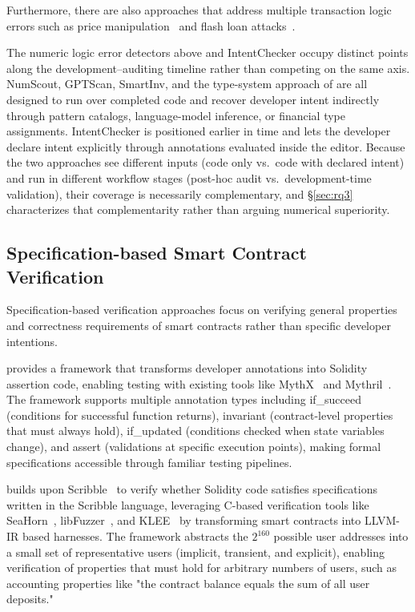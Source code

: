 \documentclass[pdflatex,sn-basic]{sn-jnl}%
\theoremstyle{thmstyleone}%
\theoremstyle{thmstyletwo}%
\theoremstyle{thmstylethree}%
\begin{document}
Furthermore, there are also approaches that address multiple transaction logic errors such as price manipulation~\citep{defiranger,defiguard,pomabuster,secplf,defitainter}
and flash loan attacks~\citep{defitail,midnight}.

The numeric logic error detectors above and IntentChecker occupy distinct points along the development--auditing timeline rather than competing on the same axis.
NumScout, GPTScan, SmartInv, and the type-system approach of \citet{accountingerrors} are all designed to run over completed code and recover developer intent indirectly through pattern catalogs, language-model inference, or financial type assignments.
IntentChecker is positioned earlier in time and lets the developer declare intent explicitly through annotations evaluated inside the editor.
Because the two approaches see different inputs (code only vs.\ code with declared intent) and run in different workflow stages (post-hoc audit vs.\ development-time validation), their coverage is necessarily complementary, and §\ref{sec:rq3} characterizes that complementarity rather than arguing numerical superiority.

\subsection{Specification-based Smart Contract Verification}
Specification-based verification approaches focus on verifying general properties and correctness requirements of smart contracts rather than specific developer intentions.

\citep{scribble} provides a framework that transforms developer annotations into Solidity assertion code,
enabling testing with existing tools like MythX~\citep{mythx} and Mythril~\citep{mythril}.
The framework supports multiple annotation types including if\_succeed (conditions for successful function returns),
invariant (contract-level properties that must always hold), if\_updated (conditions checked when state variables change),
and assert (validations at specific execution points), making formal specifications accessible through familiar testing pipelines.

\citep{smartace} builds upon Scribble~\citep{scribble} to verify whether Solidity code satisfies specifications written in the Scribble language,
leveraging C-based verification tools like SeaHorn~\citep{seahorn}, libFuzzer~\citep{libfuzzer}, and KLEE~\citep{klee} by transforming smart contracts into LLVM-IR based harnesses.
The framework abstracts the $2^{160}$ possible user addresses into a small set of representative users (implicit, transient, and explicit),
enabling verification of properties that must hold for arbitrary numbers of users, such as accounting properties like
"the contract balance equals the sum of all user deposits."
\end{document}

